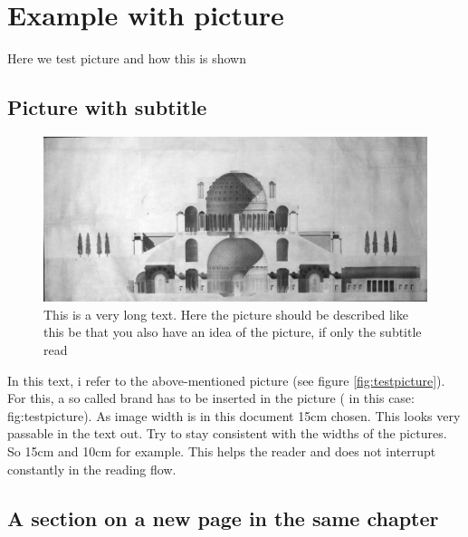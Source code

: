 

\chapter{Example with picture}

Here we test picture and how this is shown


\section{Picture with subtitle}

\begin{figure}[h]
\noindent \begin{centering}
\includegraphics[width=15cm]{images/chapter2/1799_Diplomarbeit_Schnitt}
\par\end{centering}

\protect\caption[Short title which is only displayed in the list of figures]{This is a very long text. Here the picture should be described like this be that you also have an idea of the picture, if only the subtitle read \label{fig:testpicture}}
\end{figure}


In this text, i refer to the above-mentioned picture (see figure \vref{fig:testpicture}). For this, a so called brand has to be inserted in the picture ( in this case: fig:testpicture). As image width is in this document 15cm chosen. This looks very passable in the text out. Try to stay consistent with the widths of the pictures. So 15cm and 10cm for example. This helps the reader and does not interrupt constantly in the reading flow.

\newpage

\section{A section on a new page in the same chapter}